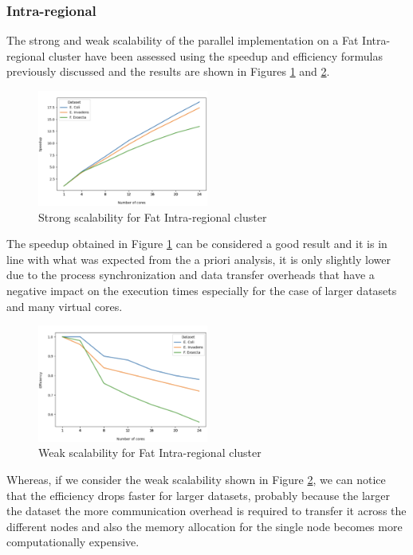 \documentclass[final,5p,times,twocolumn,authoryear]{elsarticle}
\begin{document}
\subsubsection{Intra-regional}
The strong and weak scalability of the parallel implementation on a Fat Intra-regional cluster have been assessed using the speedup and efficiency formulas previously discussed and the results are shown in Figures \ref{fig:fat-intra-strong} and \ref{fig:fat-intra-weak}. \\
\begin{figure}
    \centering
    \includegraphics[width=0.5\textwidth]{images/fat_intra_strong.png}
    \caption{Strong scalability for Fat Intra-regional cluster }
    \label{fig:fat-intra-strong}
\end{figure}
The speedup obtained in Figure \ref{fig:fat-intra-strong} can be considered a good result and it is in line with what was expected from the a priori analysis, it is only slightly lower due to the process synchronization and data transfer overheads that have a negative impact on the execution times especially for the case of larger datasets and many virtual cores. \\
\begin{figure}
    \centering
    \includegraphics[width=0.5\textwidth]{images/fat_intra_weak.png}
    \caption{Weak scalability for Fat Intra-regional cluster }
    \label{fig:fat-intra-weak}
\end{figure}
Whereas, if we consider the weak scalability shown in Figure \ref{fig:fat-intra-weak}, we can notice that the efficiency drops faster for larger datasets, probably because the larger the dataset the more communication overhead is required to transfer it across the different nodes and also the memory allocation for the single node becomes more computationally expensive. 
\end{document}
